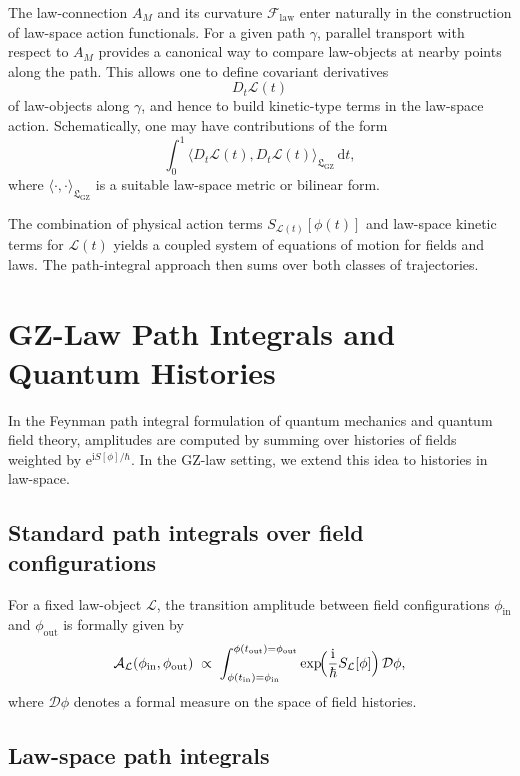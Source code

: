 \documentclass[11pt]{book}
\newcommand{\GZLS}{\ensuremath{\mathfrak{L}_{\mathrm{GZ}}}}
\newcommand{\GZLOC}{\ensuremath{A_M}}
\newcommand{\GZLCurv}{\ensuremath{\mathcal{F}_{\mathrm{law}}}}
\theoremstyle{plain}
\theoremstyle{definition}
\theoremstyle{remark}
\begin{document}
The law-connection $\GZLOC$ and its curvature $\GZLCurv$ enter
naturally in the construction of law-space action functionals. For a
given path $\gamma$, parallel transport with respect to $\GZLOC$
provides a canonical way to compare law-objects at nearby points along
the path. This allows one to define covariant derivatives
\[
   D_t \mathcal{L}(t)
\]
of law-objects along $\gamma$, and hence to build kinetic-type terms
in the law-space action. Schematically, one may have contributions of
the form
\[
   \int_0^1 \bigl\langle D_t \mathcal{L}(t),
   D_t \mathcal{L}(t)\bigr\rangle_{\GZLS}\,\mathrm{d}t,
\]
where $\langle\cdot,\cdot\rangle_{\GZLS}$ is a suitable law-space
metric or bilinear form.

The combination of physical action terms $S_{\mathcal{L}(t)}[\phi(t)]$
and law-space kinetic terms for $\mathcal{L}(t)$ yields a coupled
system of equations of motion for fields and laws. The path-integral
approach then sums over both classes of trajectories.

\section{GZ-Law Path Integrals and Quantum Histories}
\label{sec:gz-law-path-integrals}



In the Feynman path integral formulation of quantum mechanics and
quantum field theory, amplitudes are computed by summing over
histories of fields weighted by $\mathrm{e}^{\mathrm{i}S[\phi]/\hbar}$.
In the GZ-law setting, we extend this idea to histories in law-space.

\subsection{Standard path integrals over field configurations}

For a fixed law-object $\mathcal{L}$, the transition amplitude between
field configurations $\phi_{\mathrm{in}}$ and $\phi_{\mathrm{out}}$ is
formally given by
\[
   \mathcal{A}_{\mathcal{L}}(\phi_{\mathrm{in}},\phi_{\mathrm{out}})
   \;\propto\;
   \int_{\phi(t_{\mathrm{in}})=\phi_{\mathrm{in}}}^{\phi(t_{\mathrm{out}})=\phi_{\mathrm{out}}}
   \exp\!\Bigl(\frac{\mathrm{i}}{\hbar} S_{\mathcal{L}}[\phi]\Bigr)
   \,\mathcal{D}\phi,
\]
where $\mathcal{D}\phi$ denotes a formal measure on the space of
field histories.

\subsection{Law-space path integrals}
\end{document}
